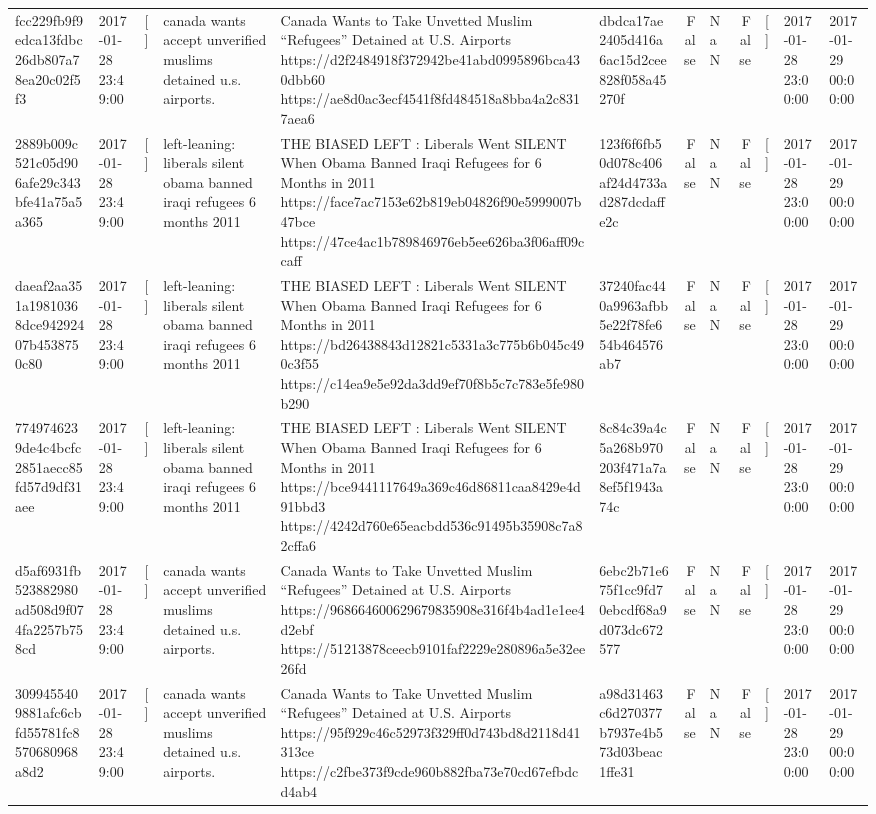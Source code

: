 \begin{tabular}{llllllrlrlll}
fcc229fb9f9edca13fdbc26db807a78ea20c02f5f3 & 2017-01-28 23:49:00 & [] & canada wants accept unverified muslims detained u.s. airports. & Canada Wants to Take Unvetted Muslim “Refugees” Detained at U.S. Airports https://d2f2484918f372942be41abd0995896bca430dbb60 https://ae8d0ac3ecf4541f8fd484518a8bba4a2c8317aea6 & dbdca17ae2405d416a6ac15d2cee828f058a45270f & False & NaN & False & [] & 2017-01-28 23:00:00 & 2017-01-29 00:00:00 \\
2889b009c521c05d906afe29c343bfe41a75a5a365 & 2017-01-28 23:49:00 & [] & left-leaning: liberals silent obama banned iraqi refugees 6 months 2011 & THE BIASED LEFT : Liberals Went SILENT When Obama Banned Iraqi Refugees for 6 Months in 2011 https://face7ac7153e62b819eb04826f90e5999007b47bce https://47ce4ac1b789846976eb5ee626ba3f06aff09ccaff & 123f6f6fb50d078c406af24d4733ad287dcdaffe2c & False & NaN & False & [] & 2017-01-28 23:00:00 & 2017-01-29 00:00:00 \\
daeaf2aa351a19810368dce94292407b4538750c80 & 2017-01-28 23:49:00 & [] & left-leaning: liberals silent obama banned iraqi refugees 6 months 2011 & THE BIASED LEFT : Liberals Went SILENT When Obama Banned Iraqi Refugees for 6 Months in 2011 https://bd26438843d12821c5331a3c775b6b045c490c3f55 https://c14ea9e5e92da3dd9ef70f8b5c7c783e5fe980b290 & 37240fac440a9963afbb5e22f78fe654b464576ab7 & False & NaN & False & [] & 2017-01-28 23:00:00 & 2017-01-29 00:00:00 \\
7749746239de4c4bcfc2851aecc85fd57d9df31aee & 2017-01-28 23:49:00 & [] & left-leaning: liberals silent obama banned iraqi refugees 6 months 2011 & THE BIASED LEFT : Liberals Went SILENT When Obama Banned Iraqi Refugees for 6 Months in 2011 https://bce9441117649a369c46d86811caa8429e4d91bbd3 https://4242d760e65eacbdd536c91495b35908c7a82cffa6 & 8c84c39a4c5a268b970203f471a7a8ef5f1943a74c & False & NaN & False & [] & 2017-01-28 23:00:00 & 2017-01-29 00:00:00 \\
d5af6931fb523882980ad508d9f074fa2257b758cd & 2017-01-28 23:49:00 & [] & canada wants accept unverified muslims detained u.s. airports. & Canada Wants to Take Unvetted Muslim “Refugees” Detained at U.S. Airports https://968664600629679835908e316f4b4ad1e1ee4d2ebf https://51213878ceecb9101faf2229e280896a5e32ee26fd & 6ebc2b71e675f1cc9fd70ebcdf68a9d073dc672577 & False & NaN & False & [] & 2017-01-28 23:00:00 & 2017-01-29 00:00:00 \\
3099455409881afc6cbfd55781fc8570680968a8d2 & 2017-01-28 23:49:00 & [] & canada wants accept unverified muslims detained u.s. airports. & Canada Wants to Take Unvetted Muslim “Refugees” Detained at U.S. Airports https://95f929c46c52973f329ff0d743bd8d2118d41313ce https://c2fbe373f9cde960b882fba73e70cd67efbdcd4ab4 & a98d31463c6d270377b7937e4b573d03beac1ffe31 & False & NaN & False & [] & 2017-01-28 23:00:00 & 2017-01-29 00:00:00 \\

\end{tabular}
